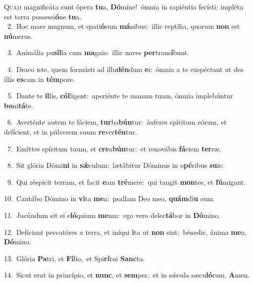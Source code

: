 \lettrine{\initial\textcolor{\initialcolor}{Q}}{uam} magnificáta sunt ópera \textbf{tu}\-a, \textbf{Dó}\-mine!~\star ómnia in sapiéntia fecísti: impléta est terra possessi\-\textbf{ó}\-ne \textbf{tu}\-a.\\
{\numbfont\textcolor{\numbcolor}{~2.}}~Hoc mare magnum, et spati\-\textbf{ó}\-sum \textbf{má}\-nibus:~\star illic reptília, quorum \textbf{non} est \textbf{nú}\-merus.\par
{\numbfont\textcolor{\numbcolor}{~3.}}~Animália pu\-\textbf{síl}\-la cum \textbf{ma}\-gnis:~\star illic naves \textbf{per}\-trans\-\textbf{í}\-bunt.\par
{\numbfont\textcolor{\numbcolor}{~4.}}~Draco iste, quem formásti ad illu\-\textbf{dén}\-dum \textbf{e}\-i:~\star ómnia a te exspéctant ut des illis \textbf{es}\-cam in \textbf{tém}\-pore.\par
{\numbfont\textcolor{\numbcolor}{~5.}}~Dante te \textbf{il}\-lis, \textbf{cól}\-ligent:~\star aperiénte te manum tuam, ómnia implebúntur \textbf{bo}\-ni\-\textbf{tá}\-te.\par
{\numbfont\textcolor{\numbcolor}{~6.}}~Averténte autem te fáciem, \textbf{tur}\-ba\-\textbf{bún}\-tur:~\star áuferes spíritum eórum, et defícient, et in púlverem suum \textbf{re}\-ver\-\textbf{tén}\-tur.\par
{\numbfont\textcolor{\numbcolor}{~7.}}~Emíttes spíritum tuum, et \textbf{cre}\-a\-\textbf{bún}\-tur:~\star et renovábis \textbf{fá}\-ciem \textbf{ter}\-ræ.\par
{\numbfont\textcolor{\numbcolor}{~8.}}~Sit glória Dómi\textbf{ni} in \textbf{sǽ}\-culum:~\star lætábitur Dóminus in o\-\textbf{pé}\-ribus \textbf{su}\-is:\par
{\numbfont\textcolor{\numbcolor}{~9.}}~Qui réspicit terram, et facit \textbf{e}\-am \textbf{tré}\-mere:~\star qui tangit \textbf{mon}\-tes, et \textbf{fú}\-migant.\par
{\numbfont\textcolor{\numbcolor}{10.}}~Cantábo Dómino in \textbf{vi}\-ta \textbf{me}\-a:~\star psallam Deo meo, \textbf{quám}\-di\textbf{u} sum.\par
{\numbfont\textcolor{\numbcolor}{11.}}~Jucúndum sit ei e\-\textbf{ló}\-quium \textbf{me}\-um:~\star ego vero delec\-\textbf{tá}\-bor in \textbf{Dó}\-mino.\par
{\numbfont\textcolor{\numbcolor}{12.}}~Defíciant peccatóres a terra, et iníqui \textbf{i}\-ta ut \textbf{non} sint:~\star bénedic, ánima \textbf{me}\-a, \textbf{Dó}\-mino.\par
{\numbfont\textcolor{\numbcolor}{13.}}~Glória \textbf{Pa}\-tri, et \textbf{Fí}\-lio,~\star et Spi\-\textbf{rí}\-tui \textbf{Sanc}\-to.\par
{\numbfont\textcolor{\numbcolor}{14.}}~Sicut erat in princípio, et \textbf{nunc}\-, et \textbf{sem}\-per,~\star et in sǽcula sæcu\-\textbf{ló}\-rum. \textbf{A}\-men.\par
